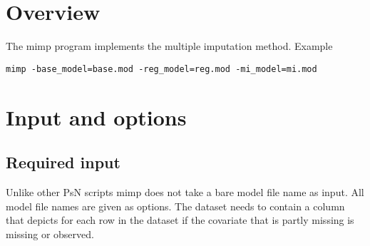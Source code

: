 



\maketitle
\newcommand{\guidetoolname}{mimp}


\section{Overview}
The mimp program implements the multiple imputation method\cite{Johansson}.
Example
\begin{verbatim}
mimp -base_model=base.mod -reg_model=reg.mod -mi_model=mi.mod
\end{verbatim}

\section{Input and options}

\subsection{Required input}
Unlike other PsN scripts mimp does not take a bare model file name as input. All model file names are given as options. The dataset needs to contain a column that depicts for each row in the dataset if the covariate that is partly missing is missing or observed.

